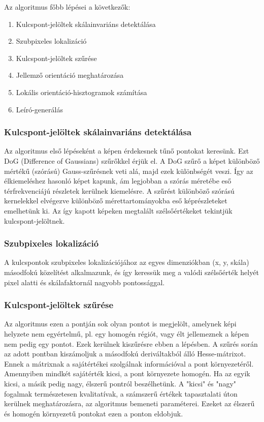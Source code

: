 \documentclass{article}
\begin{document}
	Az algoritmus főbb lépései a következők:
	
	\begin{enumerate}
	\item Kulcspont-jelöltek skálainvariáns detektálása
	\item Szubpixeles lokalizáció
	\item Kulcspont-jelöltek szűrése
	\item Jellemző orientáció meghatározása
	\item Lokális orientáció-hisztogramok számítása
	\item Leíró-generálás
	\end{enumerate}
	
	\subsubsection{Kulcspont-jelöltek skálainvariáns detektálása}
	Az algoritmus első lépéseként a képen érdekesnek tűnő pontokat keresünk. Ezt DoG (Difference of Gaussians) szűrőkkel érjük el. A DoG szűrő a képet különböző mértékű (szórású) Gauss-szűrésnek veti alá, majd ezek különbségét veszi. Így az élkiemeléshez hasonló képet kapunk, ám legjobban a szórás méretébe eső térfrekvenciájú részletek kerülnek kiemelésre. A szűrést különböző szórású kernelekkel elvégezve különböző mérettartományokba eső képrészleteket emelhetünk ki. Az így kapott képeken megtalált szélsőértékeket tekintjük kulcspont-jelöltnek.
	
	\subsubsection{Szubpixeles lokalizáció}
	A kulcspontok szubpixeles lokalizációjához az egyes dimenziókban (x, y, skála) másodfokú közelítést alkalmazunk, és így keressük meg a valódi szélsőérték helyét pixel alatti és skálafaktornál nagyobb pontossággal.
	
	\subsubsection{Kulcspont-jelöltek szűrése}
	Az algoritmus ezen a pontján sok olyan pontot is megjelölt, amelynek képi helyzete nem egyértelmű, pl. egy homogén régiót, vagy élt jellemeznek a képen nem pedig egy pontot. Ezek kerülnek kiszűrésre ebben a lépésben. A szűrés során az adott pontban kiszámoljuk a másodfokú deriváltakból álló Hesse-mátrixot. Ennek a mátrixnak a sajátértékei szolgálnak információval a pont környezetéről. Amennyiben mindkét sajátérték kicsi, a pont környezete homogén. Ha az egyik kicsi, a másik pedig nagy, élszerű pontról beszélhetünk. A "kicsi" és "nagy" fogalmak természetesen kvalitatívak, a számszerű értékek tapasztalati úton kerülnek meghatározásra, az algoritmus bemeneti paraméterei. Ezeket az élszerű és homogén környezetű pontokat ezen a ponton eldobjuk.
	
\end{document}
